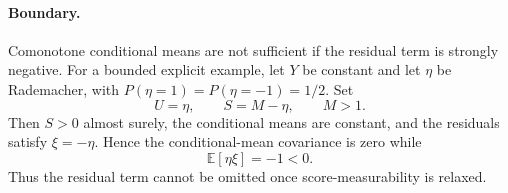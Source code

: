 \paragraph{Boundary.}
Comonotone conditional means are not sufficient if the residual term is strongly negative. For a bounded explicit example, let $Y$ be constant and let $\eta$ be Rademacher, with $P(\eta=1)=P(\eta=-1)=1/2$. Set
\[
U=\eta,
\qquad
S=M-\eta,
\qquad
M>1.
\]
Then $S>0$ almost surely, the conditional means are constant, and the residuals satisfy $\xi=-\eta$. Hence the conditional-mean covariance is zero while
\[
\mathbb E[\eta\xi]=-1<0.
\]
Thus the residual term cannot be omitted once score-measurability is relaxed.
